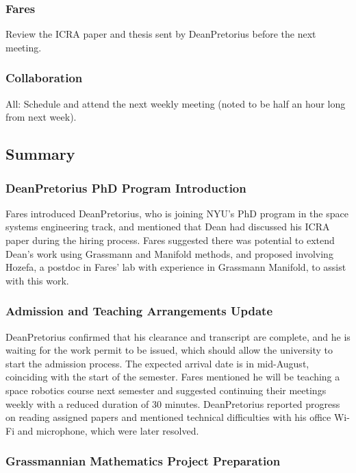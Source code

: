 \subsubsection{Fares}

Review the ICRA paper and thesis sent by DeanPretorius before the next meeting.

\subsubsection{Collaboration}

All: Schedule and attend the next weekly meeting (noted to be half an hour long from next week).

\subsection{Summary}

\subsubsection{DeanPretorius PhD Program Introduction}

Fares introduced DeanPretorius, who is joining NYU's PhD program in the space systems engineering track, and mentioned that Dean had discussed his ICRA paper during the hiring process. Fares suggested there was potential to extend Dean's work using Grassmann and Manifold methods, and proposed involving Hozefa, a postdoc in Fares' lab with experience in Grassmann Manifold, to assist with this work.

\subsubsection{Admission and Teaching Arrangements Update}

DeanPretorius confirmed that his clearance and transcript are complete, and he is waiting for the work permit to be issued, which should allow the university to start the admission process. The expected arrival date is in mid-August, coinciding with the start of the semester. Fares mentioned he will be teaching a space robotics course next semester and suggested continuing their meetings weekly with a reduced duration of 30 minutes. DeanPretorius reported progress on reading assigned papers and mentioned technical difficulties with his office Wi-Fi and microphone, which were later resolved.

\subsubsection{Grassmannian Mathematics Project Preparation}

